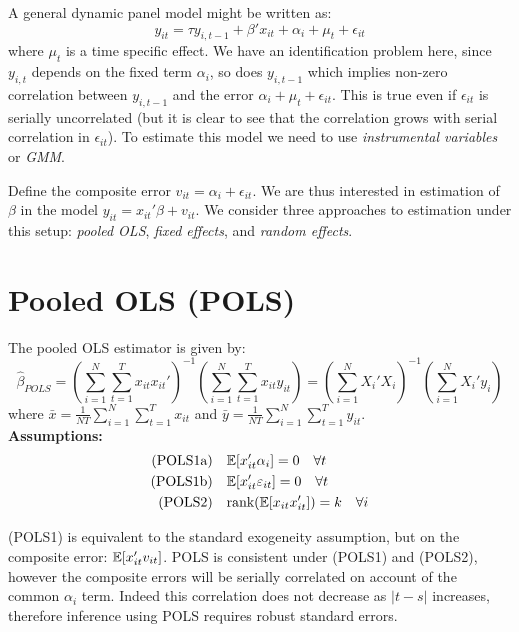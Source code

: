 \documentclass[DIV=14,titlepage=false]{scrreprt}
\begin{document}
\begin{note}
    A general dynamic panel model might be written as:
    \[
        y_{it} = \tau y_{i,t-1} +  \beta'x_{it} + \alpha_i + \mu_t + \epsilon_{it}
    \]
    where $\mu_t$ is a time specific effect. We have an identification problem here, since $y_{i,t}$ depends on the fixed term $\alpha_i$, so does $y_{i,t-1}$ which implies non-zero correlation between $y_{i,t-1}$ and the error $ \alpha_i + \mu_t + \epsilon_{it}$. This is true even if $\epsilon_{it}$ is serially uncorrelated (but it is clear to see that the correlation grows with serial correlation in $\epsilon_{it}$). To estimate this model we need to use \textit{instrumental variables} or \textit{GMM}.
\end{note}
Define the composite error $v_{it} = \alpha_i + \epsilon_{it}$. We are thus interested in estimation of $\beta$ in the model $y_{it} = x_{it}'\beta + v_{it}$. We consider three approaches to estimation under this setup: \textit{pooled OLS}, \textit{fixed effects}, and \textit{random effects}. 
\section{Pooled OLS (POLS)}
\begin{definition}
    The pooled OLS estimator is given by:
    \[
        \hat{\beta}_{POLS} = \left(\sum_{i=1}^N\sum_{t=1}^T x_{it}x_{it}'\right)^{-1}\left(\sum_{i=1}^N\sum_{t=1}^T x_{it}y_{it}\right) = \left(\sum_{i=1}^N X_i'X_i\right)^{-1}\left(\sum_{i=1}^N X_i'y_i\right)
    \]
    where $\bar{x} = \frac{1}{NT}\sum_{i=1}^N\sum_{t=1}^T x_{it}$ and $\bar{y} = \frac{1}{NT}\sum_{i=1}^N\sum_{t=1}^T y_{it}$.\\
    \textbf{Assumptions:}
    \begin{align*}
        \text{(POLS1a)}\quad &\mathbb{E}[x_{it}'\alpha_i] = 0 \quad \forall t \\
        \text{(POLS1b)}\quad & \mathbb{E}[x_{it}'\varepsilon_{it}] = 0 \quad \forall t \\
        \text{(POLS2)} \quad & \text{rank}(\mathbb{E}[x_{it}x_{it}']) = k \quad \forall i
    \end{align*}
\end{definition}
(POLS1) is equivalent to the standard exogeneity assumption, but on the composite error: $\mathbb{E}[x_{it}'v_{it}]$. POLS is consistent under (POLS1) and (POLS2), however the composite errors will be serially correlated on account of the common $\alpha_i$ term. Indeed this correlation does not decrease as $|t-s|$ increases, therefore inference using POLS requires robust standard errors.
\end{document}

